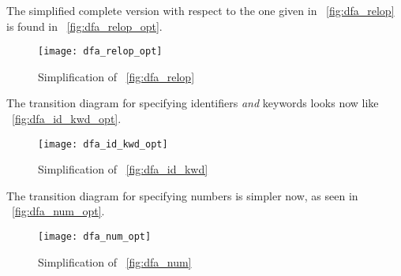 The simplified complete version with respect to the one given in
\fig~\vref{fig:dfa_relop} is found in \fig~\vref{fig:dfa_relop_opt}.
\begin{figure}
\centering
\texttt{[image: dfa\_relop\_opt]}
\caption{Simplification of \fig~\vref{fig:dfa_relop}
\label{fig:dfa_relop_opt}}
\end{figure}
The transition diagram for specifying identifiers \emph{and} keywords
looks now like \fig~\vref{fig:dfa_id_kwd_opt}.
\begin{figure}
\centering
\texttt{[image: dfa\_id\_kwd\_opt]}
\caption{Simplification of \fig~\vref{fig:dfa_id_kwd}
\label{fig:dfa_id_kwd_opt}}
\end{figure}
The transition diagram for specifying numbers is simpler now, as seen
in \fig~\vref{fig:dfa_num_opt}.
\begin{figure}
\centering
\texttt{[image: dfa\_num\_opt]}
\caption{Simplification of \fig~\vref{fig:dfa_num}
\label{fig:dfa_num_opt}}
\end{figure}


